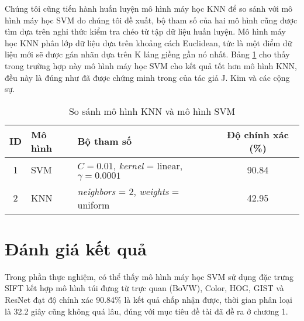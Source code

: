 Chúng tôi cũng tiến hành huấn luyện mô hình máy học KNN để so sánh với mô hình máy học SVM do chúng tôi đề xuất, bộ tham số của hai mô hình cũng được tìm dựa trên nghi thức kiểm tra chéo từ tập dữ liệu huấn luyện. Mô hình máy học KNN phân lớp dữ liệu dựa trên khoảng cách Euclidean, tức là một điểm dữ liệu mới sẽ được gán nhãn dựa trên K láng giềng gần nó nhất. Bảng \ref{tab:so-sanh-knn-svm} cho thấy trong trường hợp này mô hình máy học SVM cho kết quả tốt hơn mô hình KNN, đều này là đúng như đã được chứng minh trong \cite{kim12012comparing} của tác giả J. Kim và các cộng sự.

\begin{table}[h]
\caption{So sánh mô hình KNN và mô hình SVM}
\centering
\begin{tabular}{|c|l|l|c|}
\hline
\textbf{ID} & \textbf{Mô hình} & \textbf{Bộ tham số} & \textbf{Độ chính xác (\%)} \\ [0.5ex] \hline \hline
1 & SVM & $C = 0.01$, \emph{kernel} = linear, $\gamma = 0.0001$ & 90.84  \\
2 & KNN & \emph{neighbors} = 2, \emph{weights} = uniform & 42.95 \\ \hline
\end{tabular}
\label{tab:so-sanh-knn-svm}
\end{table}


\section{Đánh giá kết quả}
Trong phần thực nghiệm, có thể thấy mô hình máy học SVM sử dụng đặc trưng SIFT kết hợp mô hình túi đưng từ trực quan (BoVW), Color, HOG, GIST và ResNet đạt độ chính xác 90.84\% là kết quả chấp nhận được, thời gian phân loại là 32.2 giây cũng không quá lâu, đúng với mục tiêu đề tài đã đề ra ở chương 1.